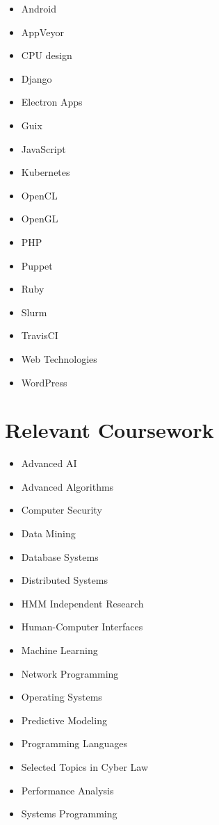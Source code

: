 \documentclass[10pt,a4paper,sans]{moderncv}        %
\begin{document}
\begin{multicols}{3}
\begin{itemize}

\item Android
\item AppVeyor
\item CPU design
\item Django
\item Electron Apps
\item Guix
\item JavaScript
\item Kubernetes
\item OpenCL
\item OpenGL
\item PHP
\item Puppet
\item Ruby
\item Slurm
\item TravisCI
\item Web Technologies
\item WordPress


\end{itemize}
\end{multicols}


\section{Relevant Coursework}

\begin{multicols}{3}
\begin{itemize}

\item Advanced AI
\item Advanced Algorithms
\item Computer Security
\item Data Mining
\item Database Systems
\item Distributed Systems
\item HMM Independent Research
\item Human-Computer Interfaces
\item Machine Learning
\item Network Programming
\item Operating Systems
\item Predictive Modeling
\item Programming Languages
\item Selected Topics in Cyber Law
\item Performance Analysis
\item Systems Programming

\end{itemize}
\end{multicols}
\end{document}
